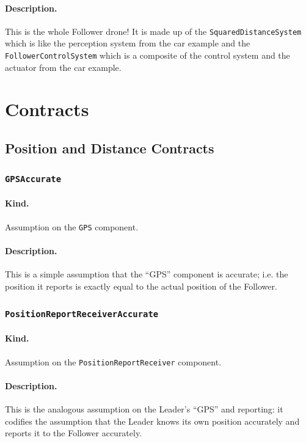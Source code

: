 \documentclass{article}
\begin{document}
\paragraph{Description.} This is the whole Follower drone! It is made up of the \texttt{SquaredDistanceSystem} which is like the perception system from the car example and the \texttt{FollowerControlSystem} which is a composite of the control system and the actuator from the car example.

\section{Contracts}

\subsection{Position and Distance Contracts}

\subsubsection{\texttt{GPSAccurate}}

\paragraph{Kind.} Assumption on the \texttt{GPS} component.

\paragraph{Description.} This is a simple assumption that the ``GPS'' component is accurate; i.e. the position it reports is exactly equal to the actual position of the Follower.

\subsubsection{\texttt{PositionReportReceiverAccurate}}

\paragraph{Kind.} Assumption on the \texttt{PositionReportReceiver} component.

\paragraph{Description.} This is the analogous assumption on the Leader's ``GPS'' and reporting: it codifies the assumption that the Leader knows its own position accurately and reports it to the Follower accurately.
\end{document}
